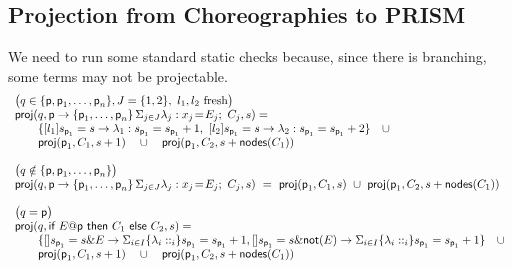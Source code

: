 \subsection{Projection from Choreographies to PRISM}
 We need to run some standard
static checks because, since there is branching, some terms may not be
projectable.
%
\begin{displaymath}
  \begin{array}{lllll}
    \big(q\in\{\textsf{p}, \textsf{p}_1,\ldots,\textsf{p}_n\}, J=\{1,2\},\ l_1, l_2 \text{ fresh}  
\big)\\
    \mathsf{proj} (q,\textsf{p}\rightarrow \{\textsf{p}_1,\ldots,\textsf{p}_n\}\,\Sigma_{j\in J} \lambda_j: x_j\!=\!E_j;\ C_j, s)= \\
    \qquad\{ 
    [l_1] s_{\textsf{p}_1} = s \rightarrow \lambda_1: s_{\textsf{p}_1} = s_{\textsf{p}_1} +1,\  
    [l_2] s_{\textsf{p}_1} = s \rightarrow \lambda_2: s_{\textsf{p}_1} = s_{\textsf{p}_1} +2  
    \}
    \quad\cup\\
    \qquad \mathsf{proj} (\textsf{p}_1, C_1, s+1)
    \quad\cup\quad
    \mathsf{proj} (\textsf{p}_1, C_2, s+\mathsf{nodes}(C_1))
    \\\\
    \big(q\notin\{\textsf{p}, \textsf{p}_1,\ldots,\textsf{p}_n\}\big)\\
    \mathsf{proj} (q,\textsf{p}\rightarrow \{\textsf{p}_1,\ldots,\textsf{p}_n\}\,\Sigma_{j\in J} \lambda_j: x_j\!=\!E_j;\ C_j, s)\ = \ \mathsf{proj} (\textsf{p}_1, C_1, s)
    \ \cup\
    \mathsf{proj} (\textsf{p}_1, C_2, s+\mathsf{nodes}(C_1))
    \\\\
    \big(q = \textsf{p}\big)\\
    \mathsf{proj} (q,\textsf{if } E@\textsf{p} \textsf{ then } {C_1} \textsf{ else } {C_2}, s)= \\
    \qquad\{ 
    [] s_{\textsf{p}_1} = s \& E \rightarrow \Sigma_{i\in I}\{\lambda_i: :_i\} s_{\textsf{p}_1} = s_{\textsf{p}_1} +1,  
    [] s_{\textsf{p}_1} = s \& \mathsf{not}(E) \rightarrow \Sigma_{i\in I}\{\lambda_i: :_i\} s_{\textsf{p}_1} = s_{\textsf{p}_1} +1  
    \}
    \quad\cup\\
    \qquad \mathsf{proj} (\textsf{p}_1, C_1, s+1)
    \quad\cup\quad
    \mathsf{proj} (\textsf{p}_1, C_2, s+\mathsf{nodes}(C_1))
  \end{array}
\end{displaymath}


       







